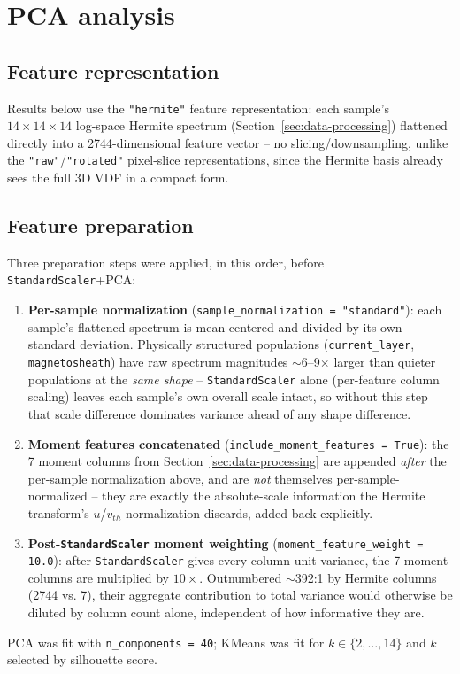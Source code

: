 \documentclass[11pt]{article}
\begin{document}
\section{PCA analysis}
\label{sec:pca}

\subsection{Feature representation}
Results below use the \texttt{"hermite"} feature representation: each
sample's $14\times14\times14$ log-space Hermite spectrum
(Section~\ref{sec:data-processing}) flattened directly into a
2744-dimensional feature vector -- no slicing/downsampling, unlike the
\texttt{"raw"}/\texttt{"rotated"} pixel-slice representations, since the
Hermite basis already sees the full 3D VDF in a compact form.

\subsection{Feature preparation}
\label{sec:pca-prep}
Three preparation steps were applied, in this order, before
\texttt{StandardScaler}+PCA:
\begin{enumerate}
  \item \textbf{Per-sample normalization} (\texttt{sample\_normalization
    = "standard"}): each sample's flattened spectrum is mean-centered
    and divided by its own standard deviation. Physically structured
    populations (\texttt{current\_layer}, \texttt{magnetosheath}) have
    raw spectrum magnitudes $\sim$6--9$\times$ larger than quieter
    populations at the \emph{same shape} -- \texttt{StandardScaler}
    alone (per-feature column scaling) leaves each sample's own overall
    scale intact, so without this step that scale difference dominates
    variance ahead of any shape difference.
  \item \textbf{Moment features concatenated} (\texttt{include\_moment\_features
    = True}): the 7 moment columns from
    Section~\ref{sec:data-processing} are appended \emph{after} the
    per-sample normalization above, and are \emph{not} themselves
    per-sample-normalized -- they are exactly the absolute-scale
    information the Hermite transform's $u$/$v_{th}$ normalization
    discards, added back explicitly.
  \item \textbf{Post-\texttt{StandardScaler} moment weighting}
    (\texttt{moment\_feature\_weight = 10.0}): after
    \texttt{StandardScaler} gives every column unit variance, the 7
    moment columns are multiplied by $10\times$. Outnumbered
    $\sim$392:1 by Hermite columns (2744 vs. 7), their aggregate
    contribution to total variance would otherwise be diluted by column
    count alone, independent of how informative they are.
\end{enumerate}
PCA was fit with \texttt{n\_components = 40}; KMeans was fit for
$k \in \{2, \dots, 14\}$ and $k$ selected by silhouette score.
\end{document}
